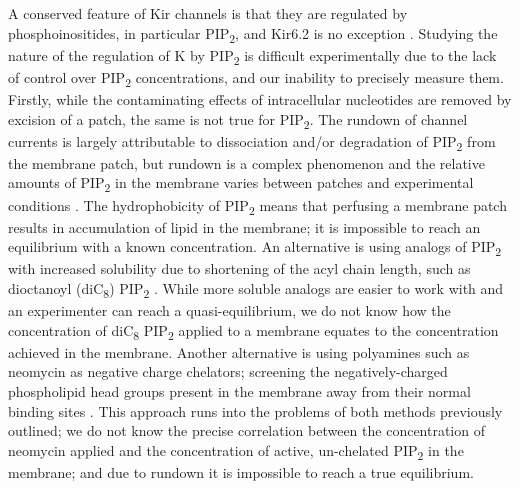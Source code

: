 A conserved feature of Kir channels is that they are regulated by phosphoinositides, in particular PIP\textsubscript{2}, and Kir6.2 is no exception \cite{hibino_inwardly_2010, fan_anionic_1997, shyng_membrane_1998, baukrowitz_pip2_1998}.
Studying the nature of the regulation of K\ATP{} by PIP\textsubscript{2} is difficult experimentally due to the lack of control over PIP\textsubscript{2} concentrations, and our inability to precisely measure them.
Firstly, while the contaminating effects of intracellular nucleotides are removed by excision of a patch, the same is not true for PIP\textsubscript{2}.
The rundown of channel currents is largely attributable to dissociation and/or degradation of PIP\textsubscript{2} from the membrane patch, but rundown is a complex phenomenon and the relative amounts of PIP\textsubscript{2} in the membrane varies between patches and experimental conditions \cite{proks_running_2016-2}.
The hydrophobicity of PIP\textsubscript{2} means that perfusing a membrane patch results in accumulation of lipid in the membrane; it is impossible to reach an equilibrium with a known concentration.
An alternative is using analogs of PIP\textsubscript{2} with increased solubility due to shortening of the acyl chain length, such as dioctanoyl (diC\textsubscript{8}) PIP\textsubscript{2} \cite{rohacs_specificity_2003}.
While more soluble analogs are easier to work with and an experimenter can reach a quasi-equilibrium, we do not know how the concentration of diC\textsubscript{8} PIP\textsubscript{2} applied to a membrane equates to the concentration achieved in the membrane.
Another alternative is using polyamines such as neomycin as negative charge chelators; screening the negatively-charged phospholipid head groups present in the membrane away from their normal binding sites \cite{fan_anionic_1997, schulze_phosphatidylinositol_2003}.
This approach runs into the problems of both methods previously outlined; we do not know the precise correlation between the concentration of neomycin applied and the concentration of active, un-chelated PIP\textsubscript{2} in the membrane; and due to rundown it is impossible to reach a true equilibrium.

